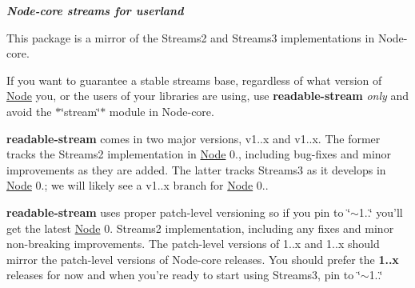 {\itshape {\bfseries Node-\/core streams for userland}}

\href{https://nodei.co/npm/readable-stream/}{\tt } \href{https://nodei.co/npm/readable-stream/}{\tt }

This package is a mirror of the Streams2 and Streams3 implementations in Node-\/core.

If you want to guarantee a stable streams base, regardless of what version of \mbox{\hyperlink{classNode}{Node}} you, or the users of your libraries are using, use {\bfseries readable-\/stream} {\itshape only} and avoid the $\ast$\char`\"{}stream\char`\"{}$\ast$ module in Node-\/core.

{\bfseries readable-\/stream} comes in two major versions, v1..\+x and v1..\+x. The former tracks the Streams2 implementation in \mbox{\hyperlink{classNode}{Node}} 0., including bug-\/fixes and minor improvements as they are added. The latter tracks Streams3 as it develops in \mbox{\hyperlink{classNode}{Node}} 0.; we will likely see a v1..\+x branch for \mbox{\hyperlink{classNode}{Node}} 0..

{\bfseries readable-\/stream} uses proper patch-\/level versioning so if you pin to {\ttfamily \char`\"{}$\sim$1..\char`\"{}} you’ll get the latest \mbox{\hyperlink{classNode}{Node}} 0. Streams2 implementation, including any fixes and minor non-\/breaking improvements. The patch-\/level versions of 1..\+x and 1..\+x should mirror the patch-\/level versions of Node-\/core releases. You should prefer the {\bfseries 1..\+x} releases for now and when you’re ready to start using Streams3, pin to {\ttfamily \char`\"{}$\sim$1..\char`\"{}} 